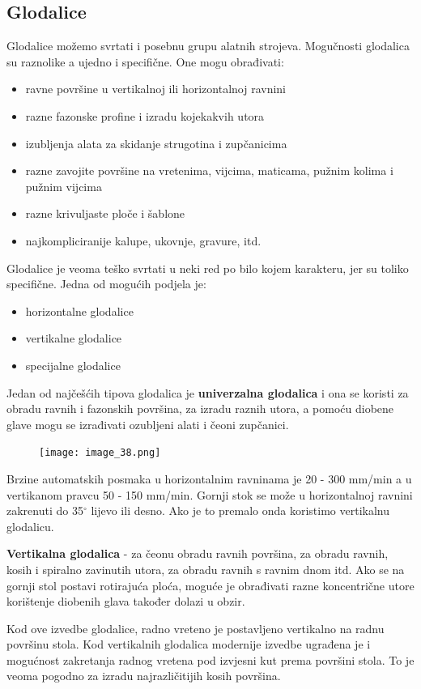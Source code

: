 \documentclass[a4paper,12pt]{article}
\numberwithin{figure}{section}
\begin{document}
\subsection{Glodalice}
Glodalice možemo svrtati i posebnu grupu alatnih strojeva. Mogučnosti glodalica su raznolike a ujedno i specifične. One mogu obrađivati:
\begin{itemize}
\item ravne površine u vertikalnoj ili horizontalnoj ravnini
\item razne fazonske profine i izradu kojekakvih utora
\item izubljenja alata za skidanje strugotina i zupčanicima
\item razne zavojite površine na vretenima, vijcima, maticama, pužnim kolima i pužnim vijcima
\item razne krivuljaste ploče i šablone
\item najkompliciranije kalupe, ukovnje, gravure, itd.
\end{itemize}
Glodalice je veoma teško svrtati u neki red po bilo kojem karakteru, jer su toliko specifične. Jedna od mogućih podjela je:
\begin{itemize}
\item horizontalne glodalice
\item vertikalne glodalice
\item specijalne glodalice
\end{itemize}
Jedan od najčešćih tipova glodalica je \textbf{univerzalna glodalica} i ona se koristi za obradu ravnih i fazonskih površina, za izradu raznih utora, a pomoću diobene glave mogu se izrađivati ozubljeni alati i čeoni zupčanici.
\begin{figure}[!h]
\centering
\texttt{[image: image\_38.png]}
\end{figure}
\FloatBarrier
Brzine automatskih posmaka u horizontalnim ravninama je 20 - 300 mm/min a u vertikanom pravcu 50 - 150 mm/min. Gornji stok se može u horizontalnoj ravnini zakrenuti do 35$^{\circ}$ lijevo ili desno. Ako je to premalo onda koristimo vertikalnu glodalicu.\par
\textbf{Vertikalna glodalica} - za čeonu obradu ravnih površina, za obradu ravnih, kosih i spiralno zavinutih utora, za obradu ravnih s ravnim dnom itd. Ako se na gornji stol postavi rotirajuća ploća, moguće je obrađivati razne koncentrične utore korištenje diobenih glava također dolazi u obzir.\par
Kod ove izvedbe glodalice, radno vreteno je postavljeno vertikalno na radnu površinu stola. Kod vertikalnih glodalica modernije izvedbe ugrađena je i mogućnost zakretanja radnog vretena pod izvjesni kut prema površini stola. To je veoma pogodno za izradu najrazličitijih kosih površina.\par
\end{document}
